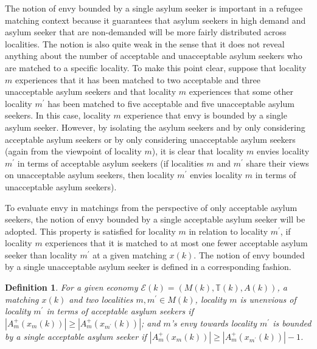 \documentclass[12pt,fleqn]{article}
\newtheorem{definition}{Definition}
\begin{document}
\noindent The notion of envy bounded by a single asylum seeker is important in a refugee matching context because it guarantees that asylum seekers in high demand and asylum seeker that are non-demanded will be more fairly distributed across localities. The notion is also quite weak in the sense that it does not reveal anything about the number of acceptable and unacceptable asylum seekers who are matched to a specific locality. To make this point clear, suppose that locality $m$ experiences that it has been matched to two acceptable and three unacceptable asylum seekers and that locality $m$ experiences that some other locality $m^\prime$ has been matched to five acceptable and five unacceptable asylum seekers. In this case, locality $m$ experience that envy is bounded by a single asylum seeker. However, by isolating the asylum seekers and by only considering acceptable asylum seekers or by only considering unacceptable asylum seekers (again from the viewpoint of locality $m$), it is clear that locality $m$ envies locality $m^\prime$ in terms of acceptable asylum seekers (if localities $m$ and $m^\prime$ share their views on unacceptable asylum seekers, then locality $m^\prime$ envies locality $m$ in terms of unacceptable asylum seekers).

To evaluate envy in matchings from the perspective of only acceptable asylum seekers, the notion of envy bounded by a single acceptable asylum seeker will be adopted. This property is satisfied for locality $m$ in relation to locality $m^\prime$, if locality $m$ experiences that it is matched to at most one fewer acceptable asylum seeker than locality $m^\prime$ at a given matching $x(k)$. The notion of envy bounded by a single unacceptable asylum seeker is defined in a corresponding fashion.

\begin{definition}\rm\label{DEF:1-Envy_ACC}
For a given economy $\mathcal{E}(k)=(M(k),\mathbb{T}(k),A(k))$, a matching $x(k)$ and two localities $m,m^\prime\in M(k)$, locality $m$ is unenvious of locality $m^\prime$ in terms of acceptable asylum seekers if $|A_m^+(x_m(k))|\geq |A_m^+(x_{m^\prime}(k))|$; and $m$'s envy towards locality $m^\prime$ is bounded by a single acceptable asylum seeker if $|A_m^+(x_m(k))|\geq |A_m^+(x_{m^\prime}(k))|-1$.
\end{definition}
\end{document}
